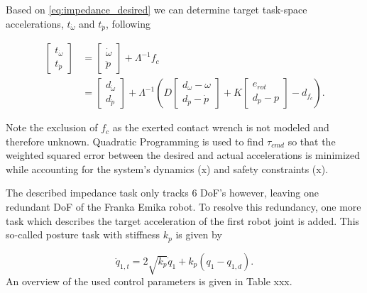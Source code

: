 \documentclass[a4paper, 10pt, conference]{ieeeconf}
\begin{document}
    Based on \ref{eq:impedance_desired} we can determine target task-space accelerations, $t_{\dot{\omega}}$ and $t_{\ddot{p}}$, following
    
    \begin{align} \begin{bmatrix}t_{\dot{\omega}}\\ t_{\ddot{p}}\end{bmatrix} &= \begin{bmatrix} {\dot{\omega}}\\{\ddot{p}}\end{bmatrix}+\Lambda^{-1} f_c\\
     &=     \begin{bmatrix} d_{\dot{\omega}}    \\ d_{\ddot{p}}  \end{bmatrix} +\Lambda^{-1} \left ( D \begin{bmatrix}d_\omega - {\omega} \\ d_{\dot{p}} - \dot{p} \end{bmatrix}  + K \begin{bmatrix} e_{rot} \\d_p - {p}  \end{bmatrix}- d_{f_c} \right ).
    \end{align}

    Note the exclusion of $f_c$ as the exerted contact wrench is not modeled and therefore unknown. Quadratic Programming is used to find $\tau_{cmd}$ so that the weighted squared error between the desired and actual accelerations is minimized while accounting for the system's dynamics (x) and safety constraints (x). 


    The described impedance task only tracks 6 DoF's however, leaving one redundant DoF of the Franka Emika robot. To resolve this redundancy, one more task which describes the target acceleration of the first robot joint is added. This so-called posture task with stiffness $k_p$ is given by
    
    \begin{equation}
    \ddot{q}_{1,t} = 2\sqrt{k_p}\dot{q}_1+k_p(q_1-q_{1,d}).
    \end{equation}
    An overview of the used control parameters is given in Table xxx.
   
\end{document}
